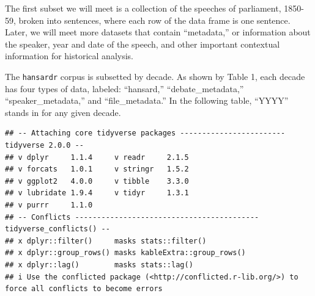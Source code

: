 \documentclass[
]{article}
\begin{document}
The first subset we will meet is a collection of the speeches of
parliament, 1850-59, broken into sentences, where each row of the data
frame is one sentence. Later, we will meet more datasets that contain
``metadata,'' or information about the speaker, year and date of the
speech, and other important contextual information for historical
analysis.

The \texttt{hansardr} corpus is subsetted by decade. As shown by Table
1, each decade has four types of data, labeled: ``hansard,''
``debate\_metadata,'' ``speaker\_metadata,'' and ``file\_metadata.'' In
the following table, ``YYYY'' stands in for any given decade.

\begin{verbatim}
## -- Attaching core tidyverse packages ------------------------ tidyverse 2.0.0 --
## v dplyr     1.1.4     v readr     2.1.5
## v forcats   1.0.1     v stringr   1.5.2
## v ggplot2   4.0.0     v tibble    3.3.0
## v lubridate 1.9.4     v tidyr     1.3.1
## v purrr     1.1.0     
## -- Conflicts ------------------------------------------ tidyverse_conflicts() --
## x dplyr::filter()     masks stats::filter()
## x dplyr::group_rows() masks kableExtra::group_rows()
## x dplyr::lag()        masks stats::lag()
## i Use the conflicted package (<http://conflicted.r-lib.org/>) to force all conflicts to become errors
\end{verbatim}
\end{document}
